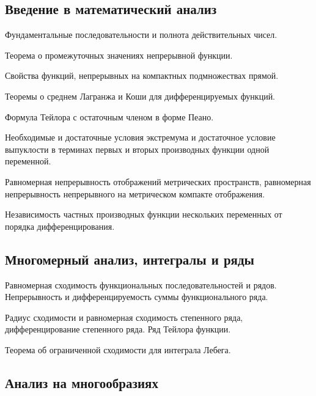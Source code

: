 \begin{enumerate*}



\subsection*{Введение в математический анализ}

\item Фундаментальные последовательности и полнота действительных чисел.
\item Теорема о промежуточных значениях непрерывной функции.
\item Свойства функций, непрерывных на компактных подмножествах прямой.
\item Теоремы о среднем Лагранжа и Коши для дифференцируемых функций.
\item Формула Тейлора с остаточным членом в форме Пеано.
\item Необходимые и достаточные условия экстремума и достаточное условие выпуклости в терминах первых и вторых производных функции одной переменной.
\item Равномерная непрерывность отображений метрических пространств, равномерная непрерывность непрерывного на метрическом компакте отображения.
\item Независимость частных производных функции нескольких переменных от порядка дифференцирования.


\subsection*{Многомерный анализ, интегралы и ряды}

\item Равномерная сходимость функциональных последовательностей и рядов. Непрерывность и дифференцируемость суммы функционального ряда.
\item  Радиус сходимости и равномерная сходимость степенного ряда, дифференцирование степенного ряда. Ряд Тейлора функции.
\item  Теорема об ограниченной сходимости для интеграла Лебега.



\subsection*{Анализ на многообразиях}


\end{enumerate*}
